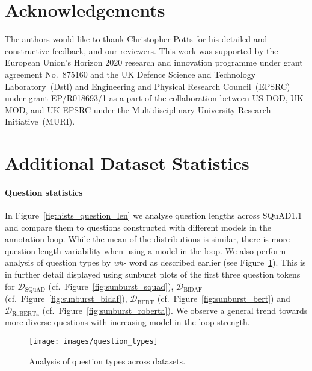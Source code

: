 \documentclass[11pt,a4paper]{article}
\newcommand{\dataset}[1]{\ensuremath{\mathcal{D_{\mathrm{#1}}}}}
\newcommand{\squadone}{SQuAD1.1}
\newif\ifappendix
\begin{document}
\section*{Acknowledgements}
The authors would like to thank Christopher Potts for his detailed and constructive feedback, and our reviewers.
This work was supported by
the European Union's Horizon 2020 research and innovation programme under grant agreement No.~875160
and
the UK Defence Science and Technology Laboratory~(Dstl) and Engineering and Physical Research Council~(EPSRC) under grant EP/R018693/1 as a part of the collaboration between US DOD, UK MOD,
and UK EPSRC under the Multidisciplinary University Research Initiative~(MURI).





\ifappendix
    \clearpage
    \appendix
    
    \section{Additional Dataset Statistics}
    \label{sec:appendix_dataset_statistics}
    
    \paragraph{Question statistics}{
    In Figure~\ref{fig:hists_question_len} we analyse question lengths across \squadone{} and compare them to questions constructed with different models in the annotation loop.
While the mean of the distributions is similar, there is more question length variability when using a model in the loop. 
We also perform analysis of question types by \textit{wh-} word as described earlier (see Figure~\ref{fig:question_types}).
This is in further detail displayed using sunburst plots of the first three question tokens for \dataset{SQuAD} (cf.~Figure~\ref{fig:sunburst_squad}), \dataset{BiDAF} (cf.~Figure~\ref{fig:sunburst_bidaf}), \dataset{BERT} (cf.~Figure~\ref{fig:sunburst_bert}) and \dataset{RoBERTa} (cf.~Figure~\ref{fig:sunburst_roberta}). 
We observe a general trend towards more diverse questions with increasing model-in-the-loop strength.
    }
    
    
\begin{figure}[t]
        \centering
        \texttt{[image: images/question\_types]}
        \caption{Analysis of question types across datasets.} 
        \label{fig:question_types}
    \end{figure}
\end{document}
